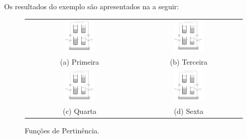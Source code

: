 Os resultados do exemplo são apresentados na  a seguir:
\begin{figure}[H]
	\centering
	\begin{tabular}{cc}
		\includegraphics[width=0.3\textwidth,keepaspectratio]{img/4tank.png} &
		\includegraphics[width=0.3\textwidth,keepaspectratio]{img/4tank.png} \\
		(a) Primeira &
		(b) Terceira \\
		\includegraphics[width=0.3\textwidth,keepaspectratio]{img/4tank.png} &
		\includegraphics[width=0.3\textwidth,keepaspectratio]{img/4tank.png} \\
		(c) Quarta &
		(d) Sexta
	\end{tabular}
	\caption{\label{figPertEx} Funções de Pertinência.}
\end{figure}	

